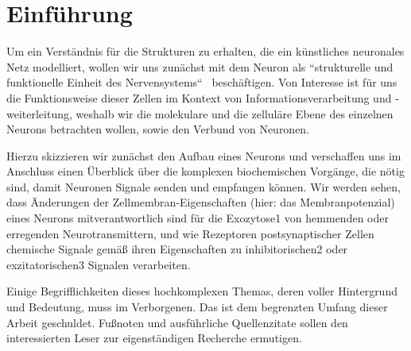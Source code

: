 \chapter{Einführung}

Um ein Verständnis für die Strukturen zu erhalten, die ein künstliches neuronales Netz modelliert, wollen wir uns zunächst mit dem Neuron als ``strukturelle und funktionelle Einheit des Nervensystems``~\cite[42]{SD07} beschäftigen.
Von Interesse ist für uns die Funktionsweise dieser Zellen im Kontext von Informationsverarbeitung und -weiterleitung, weshalb wir die molekulare und die zelluläre Ebene des einzelnen Neurons betrachten wollen, sowie den Verbund von Neuronen.

Hierzu skizzieren wir zunächst den Aufbau eines Neurons und verschaffen uns im Anschluss einen Überblick über die komplexen biochemischen Vorgänge, die nötig sind, damit Neuronen Signale senden und empfangen können. Wir werden sehen, dass Änderungen der Zellmembran-Eigenschaften (hier: das Membranpotenzial) eines Neurons mitverantwortlich sind für die Exozytose1 von hemmenden oder erregenden Neurotransmittern, und wie Rezeptoren postsynaptischer Zellen chemische Signale gemäß ihren Eigenschaften zu inhibitorischen2 oder exzitatorischen3 Signalen verarbeiten.

Einige Begrifflichkeiten dieses hochkomplexen Themas, deren voller Hintergrund und Bedeutung, muss im Verborgenen. Das ist dem begrenzten Umfang dieser Arbeit geschuldet. Fußnoten und ausführliche Quellenzitate sollen den interessierten Leser zur eigenständigen Recherche ermutigen.